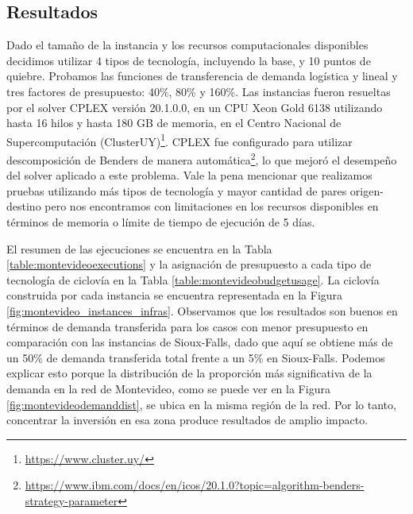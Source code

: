 \subsection{Resultados}

Dado el tamaño de la instancia y los recursos computacionales disponibles decidimos utilizar 4 tipos de tecnología, incluyendo la base, y 10 puntos de quiebre. Probamos las funciones de transferencia de demanda logística y lineal y tres factores de presupuesto: 40\%, 80\% y 160\%. Las instancias fueron resueltas por el solver CPLEX versión 20.1.0.0, en un CPU Xeon Gold 6138 utilizando hasta 16 hilos y hasta 180 GB de memoria, en el Centro Nacional de Supercomputación (ClusterUY)\footnote{\url{https://www.cluster.uy/}}. CPLEX fue configurado para utilizar descomposición de Benders de manera automática\footnote{\url{https://www.ibm.com/docs/en/icos/20.1.0?topic=algorithm-benders-strategy-parameter}}, lo que mejoró el desempeño del solver aplicado a este problema. Vale la pena mencionar que realizamos pruebas utilizando más tipos de tecnología y mayor cantidad de pares origen-destino pero nos encontramos con limitaciones en los recursos disponibles en términos de memoria o límite de tiempo de ejecución de 5 días.

El resumen de las ejecuciones se encuentra en la Tabla \ref{table:montevideoexecutions} y la asignación de presupuesto a cada tipo de tecnología de ciclovía en la Tabla \ref{table:montevideobudgetusage}. La ciclovía construida por cada instancia se encuentra representada en la Figura \ref{fig:montevideo_instances_infras}. Observamos que los resultados son buenos en términos de demanda transferida para los casos con menor presupuesto en comparación con las instancias de Sioux-Falls, dado que aquí se obtiene más de un 50\% de demanda transferida total frente a un 5\% en Sioux-Falls. Podemos explicar esto porque la distribución de la proporción más significativa de la demanda en la red de Montevideo, como se puede ver en la Figura \ref{fig:montevideodemanddist}, se ubica en la misma región de la red. Por lo tanto, concentrar la inversión en esa zona produce resultados de amplio impacto.


